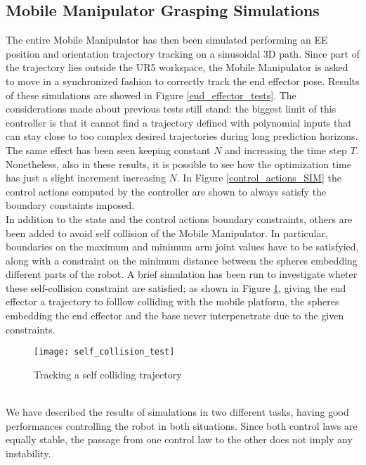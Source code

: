 \subsection{Mobile Manipulator Grasping Simulations}
The entire Mobile Manipulator has then been simulated performing an EE position and orientation trajectory tracking on a sinusoidal 3D path. Since part of the trajectory lies outside the UR5 workspace, the Mobile Manipulator is asked to move in a synchronized fashion to correctly track the end effector pose. 
Results of these simulations are showed in Figure \ref{end_effector_tests}. The considerations made about previous tests still stand: the biggest limit of this controller is that it cannot find a trajectory defined with polynomial inputs that can stay close to too complex desired trajectories during long prediction horizons. The same effect has been seen keeping constant $N$ and increasing the time step $T$. Nonetheless, also in these results, it is possible to see how the optimization time has just a slight increment increasing $N$. In Figure \ref{control_actions_SIM} the control actions computed by the controller are shown to always satisfy the boundary constaints imposed.\\
In addition to the state and the control actions boundary constraints, others are been added to avoid self collision of the Mobile Manipulator. In particular, boundaries on the maximum and minimum arm joint values have to be satisfyied, along with a constraint on the minimum distance between the spheres embedding different parts of the robot. A brief simulation has been run to investigate wheter these self-collision constraint are satisfied; as shown in Figure \ref{self_collision}, giving the end effector a trajectory to folllow colliding with the mobile platform, the spheres embedding the end effector and the base never interpenetrate due to the given constraints.
\begin{figure}[t]
\centering
\texttt{[image: self\_collision\_test]}
\caption{Tracking a self colliding trajectory}
\label{self_collision}
\end{figure}
\\
We have described the results of simulations in two different tasks, having good performances controlling the robot in both situations. Since both control laws are equally stable, the passage from one control law to the other does not imply any instability.
